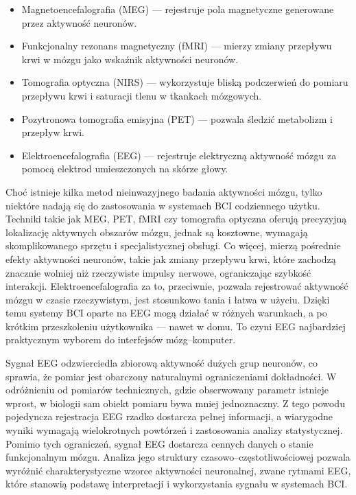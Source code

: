 \begin{itemize}
    \item Magnetoencefalografia (MEG) --- rejestruje pola magnetyczne generowane przez aktywność neuronów.
    \item Funkcjonalny rezonans magnetyczny (fMRI) --- mierzy zmiany przepływu krwi w mózgu jako wskaźnik aktywności neuronów.
    \item Tomografia optyczna (NIRS) --- wykorzystuje bliską podczerwień do pomiaru przepływu krwi i saturacji tlenu w tkankach mózgowych.
    \item Pozytronowa tomografia emisyjna (PET) --- pozwala śledzić metabolizm i przepływ krwi.
    \item Elektroencefalografia (EEG) --- rejestruje elektryczną aktywność mózgu za pomocą elektrod umieszczonych na skórze głowy.
\end{itemize}

Choć istnieje kilka metod nieinwazyjnego badania aktywności mózgu, tylko niektóre nadają się do zastosowania w systemach BCI codziennego użytku. Techniki takie jak MEG, PET, fMRI czy tomografia optyczna oferują precyzyjną lokalizację aktywnych obszarów mózgu, jednak są kosztowne, wymagają skomplikowanego sprzętu i specjalistycznej obsługi. Co więcej, mierzą pośrednie efekty aktywności neuronów, takie jak zmiany przepływu krwi, które zachodzą znacznie wolniej niż rzeczywiste impulsy nerwowe, ograniczając szybkość interakcji. Elektroencefalografia za to, przeciwnie, pozwala rejestrować aktywność mózgu w czasie rzeczywistym, jest stosunkowo tania i łatwa w użyciu. Dzięki temu systemy BCI oparte na EEG mogą działać w różnych warunkach, a po krótkim przeszkoleniu użytkownika --- nawet w domu. To czyni EEG najbardziej praktycznym wyborem do interfejsów mózg--komputer.

Sygnał EEG odzwierciedla zbiorową aktywność dużych grup neuronów, co sprawia, że pomiar jest obarczony naturalnymi ograniczeniami dokładności. W odróżnieniu od pomiarów technicznych, gdzie obserwowany parametr istnieje wprost, w biologii sam obiekt pomiaru bywa mniej jednoznaczny. Z tego powodu pojedyncza rejestracja EEG rzadko dostarcza pełnej informacji, a wiarygodne wyniki wymagają wielokrotnych powtórzeń i zastosowania analizy statystycznej. Pomimo tych ograniczeń, sygnał EEG dostarcza cennych danych o stanie funkcjonalnym mózgu. Analiza jego struktury czasowo--częstotliwościowej pozwala wyróżnić charakterystyczne wzorce aktywności neuronalnej, zwane rytmami EEG, które stanowią podstawę interpretacji i wykorzystania sygnału w systemach BCI.

